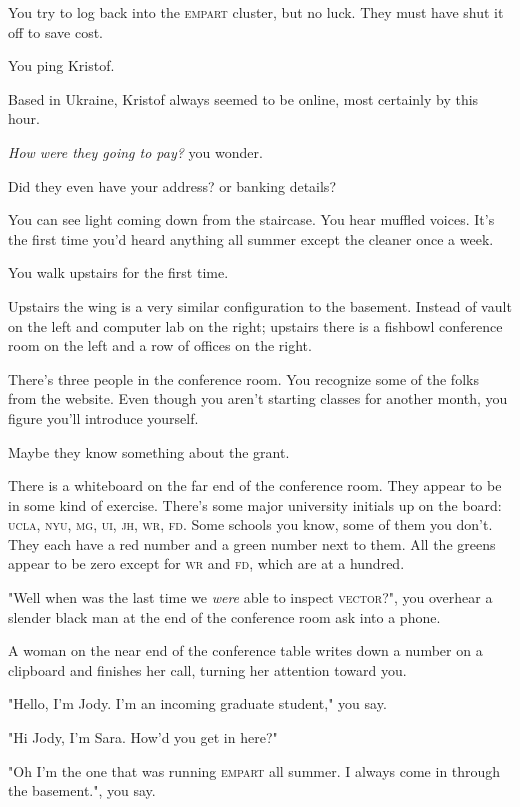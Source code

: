 \documentclass[a5paper, symmetric]{tufte-book}
\begin{document}
You try to log back into the \textsc{empart} cluster, but no luck. They must have shut it off to save cost. 

You ping Kristof. 

Based in Ukraine, Kristof always seemed to be online, most certainly by this hour. 

\textit{How were they going to pay?} you wonder.

Did they even have your address? or banking details? 

You can see light coming down from the staircase. You hear muffled voices. It's the first time you'd heard anything all summer except the cleaner once a week. 

You walk upstairs for the first time. 

Upstairs the wing is a very similar configuration to the basement. Instead of vault on the left and computer lab on the right; upstairs there is a fishbowl conference room on the left and a row of offices on the right. 

There's three people in the conference room. You recognize some of the folks from the website. Even though you aren't starting classes for another month, you figure you'll introduce yourself. 

Maybe they know something about the grant.

There is a whiteboard on the far end of the conference room. They appear to be in some kind of exercise. There's some major university initials up on the board: \textsc{ucla}, \textsc{nyu}, \textsc{mg}, \textsc{ui}, \textsc{jh}, \textsc{wr}, \textsc{fd}. Some schools you know, some of them you don't. They each have a red number and a green number next to them. All the greens appear to be zero except for \textsc{wr} and \textsc{fd}, which are at a hundred. 

"Well when was the last time we \textit{were} able to inspect \textsc{vector}?", you overhear a slender black man at the end of the conference room ask into a phone. 

A woman on the near end of the conference table writes down a number on a clipboard and finishes her call, turning her attention toward you.

"Hello, I'm Jody. I'm an incoming graduate student," you say.

"Hi Jody, I'm Sara. How'd you get in here?" 

"Oh I'm the one that was running \textsc{empart} all summer. I always come in through the basement.", you say. 
\end{document}

